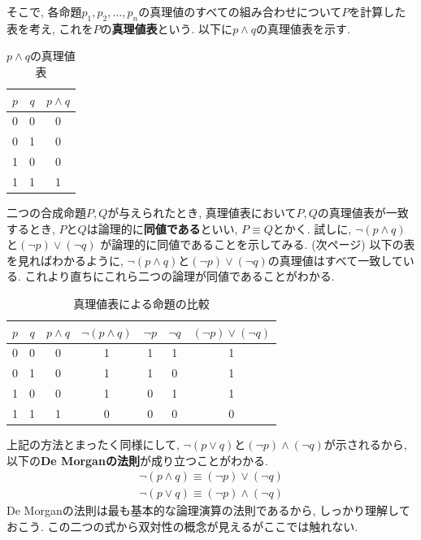 \documentclass[a4j,dvipdfmx]{jsarticle}
\numberwithin{equation}{section}
\begin{document}
            そこで, 各命題$p_1,p_2,\dots,p_n$の真理値のすべての組み合わせについて$P$を計算した表を考え, これを$P$の\textbf{真理値表}という. 以下に$p\land q$の真理値表を示す.
            \begin{table}[h]
                \centering
                \begin{tabular}{cc|c}
                    $p$ & $q$ & $p\land q$ \\\hline
                    0 & 0 & 0 \\\hline
                    0 & 1 & 0 \\\hline
                    1 & 0 & 0 \\\hline
                    1 & 1 & 1 \\\hline
                \end{tabular}
                \caption{$p\land q$の真理値表}
            \end{table}

            二つの合成命題$P,Q$が与えられたとき, 真理値表において$P,Q$の真理値表が一致するとき, $P$と$Q$は論理的に\textbf{同値である}といい, $P\equiv Q$とかく. 試しに, $\lnot (p\land q)$と$(\lnot p)\lor (\lnot q)$
            が論理的に同値であることを示してみる. (次ページ)
            \clearpage
            以下の表を見ればわかるように, $\lnot (p\land q)$と$(\lnot p)\lor (\lnot q)$の真理値はすべて一致している. これより直ちにこれら二つの論理が同値であることがわかる.

            \begin{table}[h]
                \centering
                \begin{tabular}{cc||cc|ccc}
                    $p$ & $q$ & $p\land q$ & $\lnot(p\land q)$ & $\lnot p$ & $\lnot q$ & $(\lnot p)\lor(\lnot q)$ \\\hline
                    0 & 0 & 0 & 1 & 1 & 1 & 1\\
                    0 & 1 & 0 & 1 & 1 & 0 & 1\\
                    1 & 0 & 0 & 1 & 0 & 1 & 1\\
                    1 & 1 & 1 & 0 & 0 & 0 & 0\\
                \end{tabular}
                \caption{真理値表による命題の比較}
            \end{table}

            上記の方法とまったく同様にして, $\lnot (p\lor q)$と$(\lnot p)\land (\lnot q)$が示されるから, 以下の\textbf{De Morganの法則}が成り立つことがわかる.
            \begin{align}
                \lnot (p\land q) \equiv (\lnot p) \lor (\lnot q) \label{eq:集合論基礎:論理ドモルガン1}\\
                \lnot (p\lor q) \equiv (\lnot p) \land (\lnot q) \label{eq:集合論基礎:論理ドモルガン2}
            \end{align}
            De Morganの法則は最も基本的な論理演算の法則であるから, しっかり理解しておこう. この二つの式から双対性の概念が見えるがここでは触れない.
\end{document}
